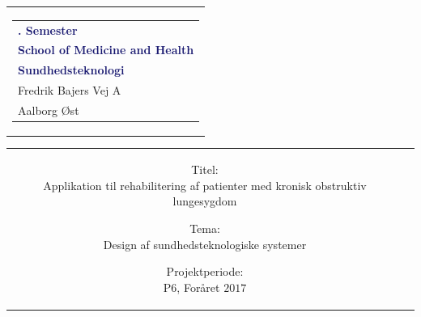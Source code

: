 % 
\thispagestyle{empty}
\begin{nopagebreak}
	{\samepage 
		
		\begin{tabular}{r}
			\parbox{\textwidth}{  
				\hfill \hspace{2cm} \parbox{8cm}{\begin{tabular}{l} %
						{\small \textbf{\textcolor{MidnightBlue}{{$6$. Semester}}}}\\
						{\small \textbf{\textcolor{MidnightBlue}{School of Medicine and Health}}}\\
						{\small \textbf{\textcolor{MidnightBlue}{Sundhedsteknologi}}}\\
						{\small \textcolor{NavyBlue}{Fredrik Bajers Vej $7$A}} \\
						{\small \textcolor{NavyBlue}{$9220$ Aalborg Øst}} \\
			\end{tabular}}}
		\end{tabular}
		
		\begin{tabular}{cc}
			\parbox{7cm}{
				\begin{description}

\item {Titel:} \\
Applikation til rehabilitering af patienter med kronisk obstruktiv lungesygdom\\

\item {Tema:} \\
Design af sundhedsteknologiske systemer \\

\end{description}

\parbox{8cm}{

\begin{description}
\item {Projektperiode:}\\
   P$6$, Foråret $2017$\\
   

\end{description}}}
\end{tabular}}
\end{nopagebreak}
